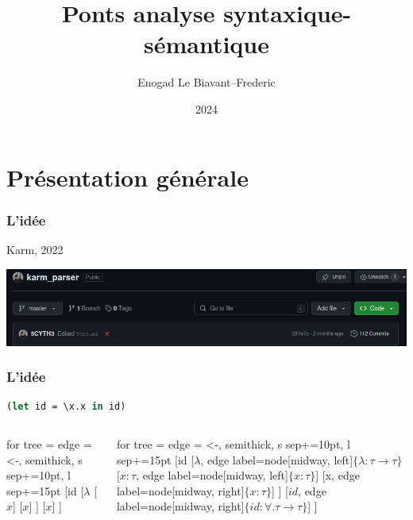 \documentclass{beamer}
\title{Ponts analyse syntaxique-sémantique}
\author{Enogad Le Biavant--Frederic}
\institute{Alain René Lesage MP2I}
\date{2024}
\begin{document}
\frame{\titlepage}

\section{Présentation générale}
\begin{frame}
		\frametitle{L'idée}
		Karm, 2022
		\begin{center}
				\includegraphics[scale=0.25]{repo}
		\end{center}
		
\end{frame}

\begin{frame}[fragile]
		\frametitle{L'idée}
		\begin{lstlisting}[language=ML]
(let id = \x.x in id)\end{lstlisting}
		\begin{columns}
				\begin{column}{0.4\textwidth}
						\begin{center}
						\begin{forest}
								for tree = {
										edge = {<-, semithick},
										s sep+=10pt,
										l sep+=15pt
								}
								[id
								[$\lambda$ [$x$] [$x$] ]
										[$x$]
								]
						\end{forest}
						\end{center}
				\end{column}
				\begin{column}{0.6\textwidth}
						\begin{center}
						\begin{forest}
								for tree = {
										edge = {<-, semithick},
										s sep+=10pt,
										l sep+=15pt
								}
								[id
										[$\lambda$, edge label={node[midway, left]{$\{\lambda:\tau\rightarrow \tau\}$}}
												[$x:\tau$, edge label={node[midway, left]{$\{x:\tau\}$}}]
												[x, edge label={node[midway, right]{$\{x:\tau\}$}}]
										]
										[$id$, edge label={node[midway, right]{$\{id:\forall.\tau\rightarrow\tau\}$}}]
								]
						\end{forest}
						\end{center}
				\end{column}
		\end{columns}
\end{frame}
\end{document}
